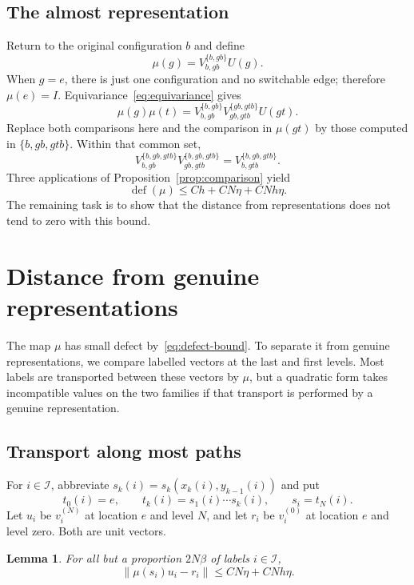 \documentclass[11pt]{article}
\numberwithin{equation}{section}
\newtheorem{lemma}[theorem]{Lemma}
\theoremstyle{definition}
\theoremstyle{remark}
\newcommand{\norm}[1]{\left\lVert#1\right\rVert}
\newcommand{\defect}{\operatorname{def}}
\newcommand{\cI}{\mathcal I}
\begin{document}
\subsection{The almost representation}
Return to the original configuration $b$ and define
\begin{equation}\label{eq:mu}
 \mu(g)=V_{b,gb}^{\{b,gb\}}U(g).
\end{equation}
When $g=e$, there is just one configuration and no switchable edge;
therefore $\mu(e)=I$. Equivariance~\eqref{eq:equivariance} gives
\[
 \mu(g)\mu(t)
 =V_{b,gb}^{\{b,gb\}}V_{gb,gtb}^{\{gb,gtb\}}U(gt).
\]
Replace both comparisons here and the comparison in $\mu(gt)$ by those
computed in $\{b,gb,gtb\}$. Within that common set,
\[
 V_{b,gb}^{\{b,gb,gtb\}}V_{gb,gtb}^{\{b,gb,gtb\}}
 =V_{b,gtb}^{\{b,gb,gtb\}}.
\]
Three applications of Proposition~\ref{prop:comparison} yield
\begin{equation}\label{eq:defect-bound}
 \defect(\mu)\le Ch+CN\eta+CNh\eta.
\end{equation}
The remaining task is to show that the distance from representations
does not tend to zero with this bound.

\section{Distance from genuine representations}\label{sec:obstruction}

The map $\mu$ has small defect by~\eqref{eq:defect-bound}. To separate it
from genuine representations, we compare labelled vectors at the last
and first levels. Most labels are transported between these vectors by
$\mu$, but a quadratic form takes incompatible values on the two families
if that transport is performed by a genuine representation.

\subsection{Transport along most paths}
For $i\in\cI$, abbreviate $s_k(i)=s_k(x_k(i),y_{k-1}(i))$ and put
\[
 t_0(i)=e,\qquad t_k(i)=s_1(i)\cdots s_k(i),\qquad s_i=t_N(i).
\]
Let $u_i$ be $v_i^{(N)}$ at location $e$ and level $N$, and let $r_i$ be
$v_i^{(0)}$ at location $e$ and level zero. Both are unit vectors.

\begin{lemma}\label{lem:transport}
For all but a proportion $2N\beta$ of labels $i\in\cI$,
\begin{equation}\label{eq:transport-bound}
 \norm{\mu(s_i)u_i-r_i}\le CN\eta+CNh\eta.
\end{equation}
\end{lemma}
\end{document}
